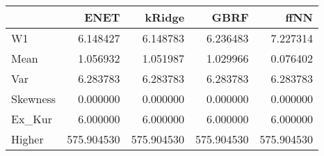 \begin{tabular}{lrrrr}
\toprule
{} &        ENET &      kRidge &        GBRF &        ffNN \\
\midrule
W1       &    6.148427 &    6.148783 &    6.236483 &    7.227314 \\
Mean     &    1.056932 &    1.051987 &    1.029966 &    0.076402 \\
Var      &    6.283783 &    6.283783 &    6.283783 &    6.283783 \\
Skewness &    0.000000 &    0.000000 &    0.000000 &    0.000000 \\
Ex\_Kur   &    6.000000 &    6.000000 &    6.000000 &    6.000000 \\
Higher   &  575.904530 &  575.904530 &  575.904530 &  575.904530 \\
\bottomrule
\end{tabular}
